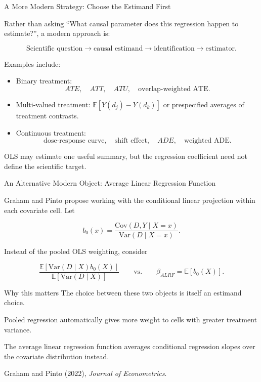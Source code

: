 \documentclass[aspectratio=169,11pt]{beamer}
\begin{document}

\begin{frame}{A More Modern Strategy: Choose the Estimand First}
\small

Rather than asking
``What causal parameter does this regression happen to estimate?'',
a modern approach is:

\[
\boxed{
\text{Scientific question}
\rightarrow
\text{causal estimand}
\rightarrow
\text{identification}
\rightarrow
\text{estimator}.
}
\]

Examples include:

\begin{itemize}
    \item Binary treatment:
    \[
    ATE,\quad ATT,\quad ATU,\quad
    \text{overlap-weighted ATE}.
    \]

    \item Multi-valued treatment:
    \(\mathbb{E}[Y(d_j)-Y(d_k)]\)
    or prespecified averages of treatment contrasts.

    \item Continuous treatment:
    \[
    \text{dose-response curve},
    \quad
    \text{shift effect},
    \quad
    ADE,
    \quad
    \text{weighted ADE}.
    \]
\end{itemize}

OLS may estimate one useful summary, but the regression coefficient
need not define the scientific target.

\end{frame}


\begin{frame}{An Alternative Modern Object: Average Linear Regression Function}
\small

Graham and Pinto propose working with the conditional linear
projection within each covariate cell. Let

\[
b_0(x)
=
\frac{
\mathrm{Cov}(D,Y\mid X=x)
}{
\mathrm{Var}(D\mid X=x)
}.
\]

Instead of the pooled OLS weighting, consider

\[
\frac{
\mathbb{E}
[
\mathrm{Var}(D\mid X)b_0(X)
]
}{
\mathbb{E}
[
\mathrm{Var}(D\mid X)
]
}
\qquad\text{vs.}\qquad
\boxed{
\beta_{ALRF}
=
\mathbb{E}[b_0(X)].
}
\]

\begin{block}{Why this matters}
The choice between these two objects is itself an estimand choice.

Pooled regression automatically gives more weight to cells with
greater treatment variance.

The average linear regression function averages conditional
regression slopes over the covariate distribution instead.
\end{block}

\scriptsize
Graham and Pinto (2022), \emph{Journal of Econometrics}.

\end{frame}
\end{document}
